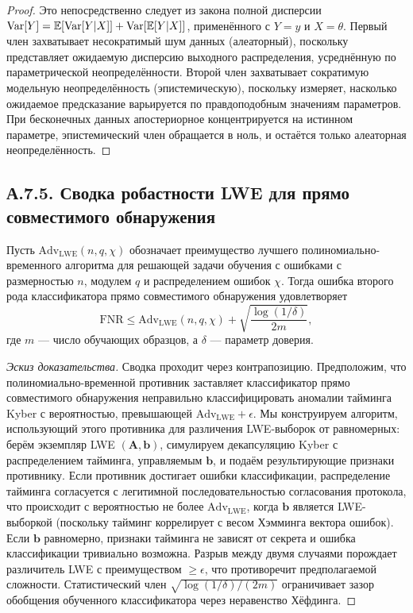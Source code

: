 \begin{proof}
Это непосредственно следует из закона полной дисперсии $\mathrm{Var}[Y]=\mathbb{E}[\mathrm{Var}[Y|X]]+\mathrm{Var}[\mathbb{E}[Y|X]]$, применённого с $Y=y$ и $X=\theta$. Первый член захватывает несократимый шум данных (алеаторный), поскольку представляет ожидаемую дисперсию выходного распределения, усреднённую по параметрической неопределённости. Второй член захватывает сократимую модельную неопределённость (эпистемическую), поскольку измеряет, насколько ожидаемое предсказание варьируется по правдоподобным значениям параметров. При бесконечных данных апостериорное концентрируется на истинном параметре, эпистемический член обращается в ноль, и остаётся только алеаторная неопределённость.
\end{proof}


\subsection*{А.7.5. Сводка робастности LWE для прямо совместимого обнаружения}
\label{app:lwe_reduction}

\begin{proposition}
\label{prop:lwe}
Пусть $\mathrm{Adv}_{\mathrm{LWE}}(n,q,\chi)$ обозначает преимущество лучшего полиномиально-временного алгоритма для решающей задачи обучения с ошибками с размерностью $n$, модулем $q$ и распределением ошибок $\chi$. Тогда ошибка второго рода классификатора прямо совместимого обнаружения удовлетворяет
\begin{equation}
\mathrm{FNR} \le \mathrm{Adv}_{\mathrm{LWE}}(n,q,\chi) + \sqrt{\frac{\log(1/\delta)}{2m}},
\end{equation}
где $m$ --- число обучающих образцов, а $\delta$ --- параметр доверия.
\end{proposition}

\begin{proof}[Эскиз доказательства]
Сводка проходит через контрапозицию. Предположим, что полиномиально-временной противник заставляет классификатор прямо совместимого обнаружения неправильно классифицировать аномалии тайминга Kyber с вероятностью, превышающей $\mathrm{Adv}_{\mathrm{LWE}}+\epsilon$. Мы конструируем алгоритм, использующий этого противника для различения LWE-выборок от равномерных: берём экземпляр LWE $(\mathbf{A},\mathbf{b})$, симулируем декапсуляцию Kyber с распределением тайминга, управляемым $\mathbf{b}$, и подаём результирующие признаки противнику. Если противник достигает ошибки классификации, распределение тайминга согласуется с легитимной последовательностью согласования протокола, что происходит с вероятностью не более $\mathrm{Adv}_{\mathrm{LWE}}$, когда $\mathbf{b}$ является LWE-выборкой (поскольку тайминг коррелирует с весом Хэмминга вектора ошибок). Если $\mathbf{b}$ равномерно, признаки тайминга не зависят от секрета и ошибка классификации тривиально возможна. Разрыв между двумя случаями порождает различитель LWE с преимуществом $\ge\epsilon$, что противоречит предполагаемой сложности. Статистический член $\sqrt{\log(1/\delta)/(2m)}$ ограничивает зазор обобщения обученного классификатора через неравенство Хёфдинга.
\end{proof}



